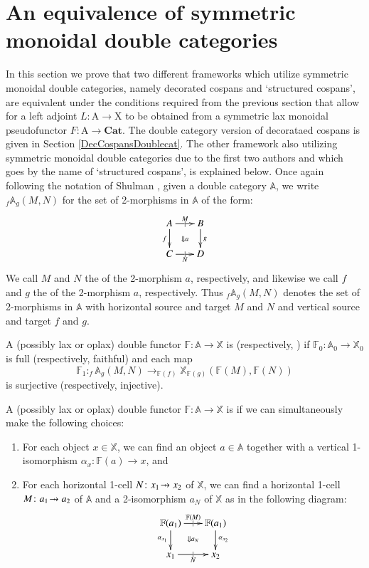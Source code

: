 \documentclass{amsart}
\begin{document}
\section{An equivalence of symmetric monoidal double categories}
In this section we prove that two different frameworks which utilize symmetric monoidal double categories, namely decorated cospans and `structured cospans', are equivalent under the conditions required from the previous section that allow for a left adjoint $L \colon \mathrm{A} \to \mathrm{X}$ to be obtained from a symmetric lax monoidal pseudofunctor $F \colon \mathrm{A} \to \mathbf{Cat}$. The double category version of decorataed cospans is given in Section \ref{DecCospansDoublecat}. The other framework also utilizing symmetric monoidal double categories due to the first two authors and which goes by the name of `structured cospans', is explained below. Once again following the notation of Shulman \cite{Shul2}, given a double category $\mathbb{A}$, we write $_f \mathbb{A}_g(M,N)$ for the set of 2-morphisms in $\mathbb{A}$ of the form:
\[
  \xymatrix@-.5pc{
    A \ar[r]|{|}^{M}  \ar[d]_f \ar@{}[dr]|{\Downarrow a}&
    B\ar[d]^g\\
    C \ar[r]|{|}_N & D
  }
\]
We call $M$ and $N$ the  of the 2-morphism $a$, respectively, and likewise we call $f$ and $g$ the  of the 2-morphism $a$, respectively. Thus $_f \mathbb{A}_g(M,N)$ denotes the set of 2-morphisms in $\mathbb{A}$ with horizontal source and target $M$ and $N$ and vertical source and target $f$ and $g$.
\begin{defn}
A (possibly lax or oplax) double functor $\mathbb{F} \colon \mathbb{A} \to \mathbb{X}$ is  (respectively, ) if $\mathbb{F}_0 \colon \mathbb{A}_0 \to \mathbb{X}_0$ is full (respectively, faithful) and each map $$\mathbb{F}_1 \colon _f \mathbb{A}_g(M,N) \to _{\mathbb{F}(f)} \mathbb{X}_{\mathbb{F}(g)}(\mathbb{F}(M),\mathbb{F}(N))$$ is surjective (respectively, injective).
\end{defn}
\begin{defn}
A (possibly lax or oplax) double functor $\mathbb{F} \colon \mathbb{A} \to \mathbb{X}$ is  if we can simultaneously make the following choices:
\begin{enumerate}
\item{For each object $x \in \mathbb{X}$, we can find an object $a \in \mathbb{A}$ together with a vertical 1-isomorphism $\alpha_x \colon \mathbb{F}(a) \to x$, and}
\item{For each horizontal 1-cell $N \colon x_1 \tobar x_2$  of $\mathbb{X}$, we can find a horizontal 1-cell $M \colon a_1 \tobar a_2$ of $\mathbb{A}$ and a 2-isomorphism $a_{N}$ of $\mathbb{X}$ as in the following diagram:
\[
  \xymatrix@-.5pc{
    \mathbb{F}(a_1) \ar[r]|{|}^{\mathbb{F}(M)}  \ar[d]_{\alpha_{x_1}} \ar@{}[dr]|{\Downarrow a_N}&
    \mathbb{F}(a_1) \ar[d]^{\alpha_{x_2}}\\
    x_1 \ar[r]|{|}_N & x_2
  }
\]
}
\end{enumerate}
\end{defn}
\end{document}
